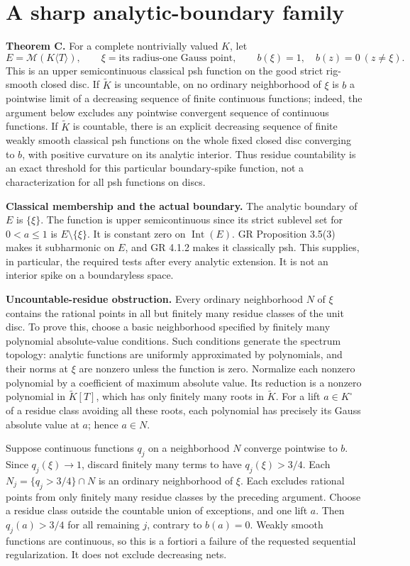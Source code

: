 \documentclass[11pt]{article}
\begin{document}
\section{A sharp analytic-boundary family}

\textbf{Theorem C.} For a complete nontrivially valued \(K\), let
\[
E=\mathcal M(K\langle T\rangle),\qquad \xi=\text{its radius-one Gauss point},\qquad
b(\xi)=1,\quad b(z)=0\ (z\ne\xi).
\]
This is an upper semicontinuous classical psh function on the good strict rig-smooth closed disc. If \(\widetilde K\) is uncountable, on no ordinary neighborhood of \(\xi\) is \(b\) a pointwise limit of a decreasing sequence of finite continuous functions; indeed, the argument below excludes any pointwise convergent sequence of continuous functions. If \(\widetilde K\) is countable, there is an explicit decreasing sequence of finite weakly smooth classical psh functions on the whole fixed closed disc converging to \(b\), with positive curvature on its analytic interior. Thus residue countability is an exact threshold for this particular boundary-spike function, not a characterization for all psh functions on discs.

\textbf{Classical membership and the actual boundary.} The analytic boundary of \(E\) is \(\{\xi\}\). The function is upper semicontinuous since its strict sublevel set for \(0<a\le1\) is \(E\setminus\{\xi\}\). It is constant zero on \(\operatorname{Int}(E)\). GR Proposition 3.5(3) makes it subharmonic on \(E\), and GR 4.1.2 makes it classically psh. This supplies, in particular, the required tests after every analytic extension. It is not an interior spike on a boundaryless space.

\textbf{Uncountable-residue obstruction.} Every ordinary neighborhood \(N\) of \(\xi\) contains the rational points in all but finitely many residue classes of the unit disc. To prove this, choose a basic neighborhood specified by finitely many polynomial absolute-value conditions. Such conditions generate the spectrum topology: analytic functions are uniformly approximated by polynomials, and their norms at \(\xi\) are nonzero unless the function is zero. Normalize each nonzero polynomial by a coefficient of maximum absolute value. Its reduction is a nonzero polynomial in \(\widetilde K[T]\), which has only finitely many roots in \(\widetilde K\). For a lift \(a\in K^\circ\) of a residue class avoiding all these roots, each polynomial has precisely its Gauss absolute value at \(a\); hence \(a\in N\).

Suppose continuous functions \(q_j\) on a neighborhood \(N\) converge pointwise to \(b\). Since \(q_j(\xi)\to1\), discard finitely many terms to have \(q_j(\xi)>3/4\). Each \(N_j=\{q_j>3/4\}\cap N\) is an ordinary neighborhood of \(\xi\). Each excludes rational points from only finitely many residue classes by the preceding argument. Choose a residue class outside the countable union of exceptions, and one lift \(a\). Then \(q_j(a)>3/4\) for all remaining \(j\), contrary to \(b(a)=0\). Weakly smooth functions are continuous, so this is a fortiori a failure of the requested sequential regularization. It does not exclude decreasing nets.
\end{document}
